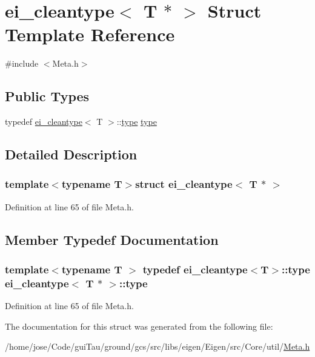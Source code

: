 \hypertarget{structei__cleantype_3_01_t_01_5_01_4}{\section{ei\-\_\-cleantype$<$ T $\ast$ $>$ Struct Template Reference}
\label{structei__cleantype_3_01_t_01_5_01_4}
}


{\ttfamily \#include $<$Meta.\-h$>$}

\subsection*{Public Types}
\begin{DoxyCompactItemize}
\item 
typedef \hyperlink{structei__cleantype}{ei\-\_\-cleantype}$<$ T $>$\-::\hyperlink{structei__cleantype_3_01_t_01_5_01_4_ab5aff1ed235edac791588bd44e1c1249}{type} \hyperlink{structei__cleantype_3_01_t_01_5_01_4_ab5aff1ed235edac791588bd44e1c1249}{type}
\end{DoxyCompactItemize}


\subsection{Detailed Description}
\subsubsection*{template$<$typename T$>$struct ei\-\_\-cleantype$<$ T $\ast$ $>$}



Definition at line 65 of file Meta.\-h.



\subsection{Member Typedef Documentation}
\hypertarget{structei__cleantype_3_01_t_01_5_01_4_ab5aff1ed235edac791588bd44e1c1249}{
\subsubsection[{type}]{\setlength{\rightskip}{0pt plus 5cm}template$<$typename T $>$ typedef {\bf ei\-\_\-cleantype}$<$T$>$\-::{\bf type} {\bf ei\-\_\-cleantype}$<$ T $\ast$ $>$\-::{\bf type}}}\label{structei__cleantype_3_01_t_01_5_01_4_ab5aff1ed235edac791588bd44e1c1249}


Definition at line 65 of file Meta.\-h.



The documentation for this struct was generated from the following file\-:\begin{DoxyCompactItemize}
\item 
/home/jose/\-Code/gui\-Tau/ground/gcs/src/libs/eigen/\-Eigen/src/\-Core/util/\hyperlink{_meta_8h}{Meta.\-h}\end{DoxyCompactItemize}
